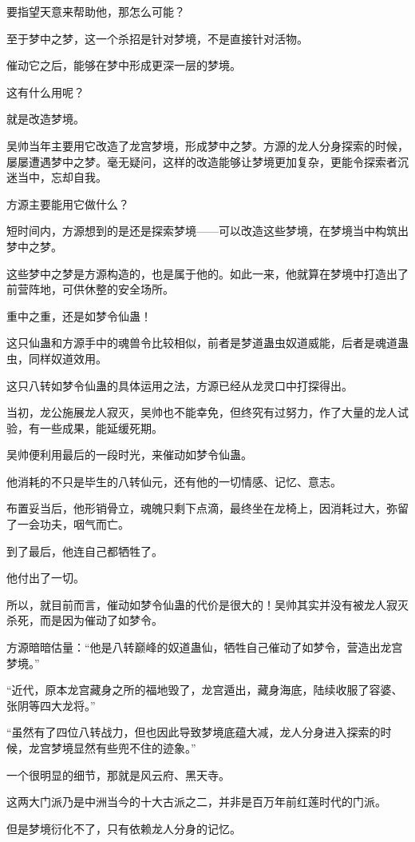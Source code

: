 \begin{this_body}
要指望天意来帮助他，那怎么可能？

至于梦中之梦，这一个杀招是针对梦境，不是直接针对活物。

催动它之后，能够在梦中形成更深一层的梦境。

这有什么用呢？

就是改造梦境。

吴帅当年主要用它改造了龙宫梦境，形成梦中之梦。方源的龙人分身探索的时候，屡屡遭遇梦中之梦。毫无疑问，这样的改造能够让梦境更加复杂，更能令探索者沉迷当中，忘却自我。

方源主要能用它做什么？

短时间内，方源想到的是还是探索梦境——可以改造这些梦境，在梦境当中构筑出梦中之梦。

这些梦中之梦是方源构造的，也是属于他的。如此一来，他就算在梦境中打造出了前营阵地，可供休整的安全场所。

重中之重，还是如梦令仙蛊！

这只仙蛊和方源手中的魂兽令比较相似，前者是梦道蛊虫奴道威能，后者是魂道蛊虫，同样奴道效用。

这只八转如梦令仙蛊的具体运用之法，方源已经从龙灵口中打探得出。

当初，龙公施展龙人寂灭，吴帅也不能幸免，但终究有过努力，作了大量的龙人试验，有一些成果，能延缓死期。

吴帅便利用最后的一段时光，来催动如梦令仙蛊。

他消耗的不只是毕生的八转仙元，还有他的一切情感、记忆、意志。

布置妥当后，他形销骨立，魂魄只剩下点滴，最终坐在龙椅上，因消耗过大，弥留了一会功夫，咽气而亡。

到了最后，他连自己都牺牲了。

他付出了一切。

所以，就目前而言，催动如梦令仙蛊的代价是很大的！吴帅其实并没有被龙人寂灭杀死，而是因为催动了如梦令。

方源暗暗估量：“他是八转巅峰的奴道蛊仙，牺牲自己催动了如梦令，营造出龙宫梦境。”

“近代，原本龙宫藏身之所的福地毁了，龙宫遁出，藏身海底，陆续收服了容婆、张阴等四大龙将。”

“虽然有了四位八转战力，但也因此导致梦境底蕴大减，龙人分身进入探索的时候，龙宫梦境显然有些兜不住的迹象。”

一个很明显的细节，那就是风云府、黑天寺。

这两大门派乃是中洲当今的十大古派之二，并非是百万年前红莲时代的门派。

但是梦境衍化不了，只有依赖龙人分身的记忆。


\end{this_body}
